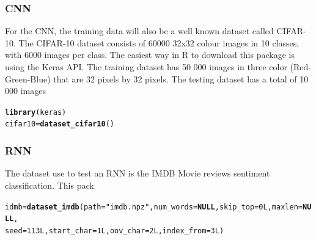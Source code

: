 \documentclass[6pt,letter]{article}\usepackage[]{graphicx}\usepackage[]{color}
\makeatletter
\newcommand{\hlnum}[1]{\textcolor[rgb]{0.686,0.059,0.569}{#1}}%
\newcommand{\hlstr}[1]{\textcolor[rgb]{0.192,0.494,0.8}{#1}}%
\newcommand{\hlstd}[1]{\textcolor[rgb]{0.345,0.345,0.345}{#1}}%
\newcommand{\hlkwa}[1]{\textcolor[rgb]{0.161,0.373,0.58}{\textbf{#1}}}%
\newcommand{\hlkwb}[1]{\textcolor[rgb]{0.69,0.353,0.396}{#1}}%
\newcommand{\hlkwc}[1]{\textcolor[rgb]{0.333,0.667,0.333}{#1}}%
\newcommand{\hlkwd}[1]{\textcolor[rgb]{0.737,0.353,0.396}{\textbf{#1}}}%
\newenvironment{kframe}{%
 \def\at@end@of@kframe{}%
 \ifinner\ifhmode%
  \def\at@end@of@kframe{\end{minipage}}%
  \begin{minipage}{\columnwidth}%
 \fi\fi%
 \def\FrameCommand##1{\hskip\@totalleftmargin \hskip-\fboxsep
 \colorbox{shadecolor}{##1}\hskip-\fboxsep
     \hskip-\linewidth \hskip-\@totalleftmargin \hskip\columnwidth}%
 \MakeFramed {\advance\hsize-\width
   \@totalleftmargin\z@ \linewidth\hsize
   \@setminipage}}%
 {\par\unskip\endMakeFramed%
 \at@end@of@kframe}
\newenvironment{knitrout}{}{} %
\makeatother
\begin{document}
\subsubsection{CNN}
For the CNN, the training data will also be a well known dataset called CIFAR-10. The CIFAR-10 dataset consists of 60000 32x32 colour images in 10 classes, with 6000 images per class. The easiest way in R to download this package is using the Keras API. The training dataset has 50 000 images in three color (Red-Green-Blue) that are 32 pixels by 32 pixels. The testing dataset has a total of 10 000 images
\begin{knitrout}
\color{fgcolor}\begin{kframe}
\begin{alltt}
\hlkwd{library}\hlstd{(keras)}
\hlstd{cifar10} \hlkwb{=} \hlkwd{dataset_cifar10}\hlstd{()}
\end{alltt}
\end{kframe}
\end{knitrout}

\subsubsection{RNN}
The dataset use to test an RNN is the IMDB Movie reviews sentiment classification. This pack
\begin{knitrout}
\color{fgcolor}\begin{kframe}
\begin{alltt}
\hlstd{idmb} \hlkwb{=} \hlkwd{dataset_imdb}\hlstd{(}  \hlkwc{path} \hlstd{=} \hlstr{"imdb.npz"}\hlstd{,} \hlkwc{num_words} \hlstd{=} \hlkwa{NULL}\hlstd{,} \hlkwc{skip_top} \hlstd{=} \hlnum{0L}\hlstd{,} \hlkwc{maxlen} \hlstd{=} \hlkwa{NULL}\hlstd{,}
                      \hlkwc{seed} \hlstd{=} \hlnum{113L}\hlstd{,} \hlkwc{start_char} \hlstd{=} \hlnum{1L}\hlstd{,} \hlkwc{oov_char} \hlstd{=} \hlnum{2L}\hlstd{,} \hlkwc{index_from} \hlstd{=} \hlnum{3L}\hlstd{)}
\end{alltt}
\end{kframe}
\end{knitrout}

\end{document}
